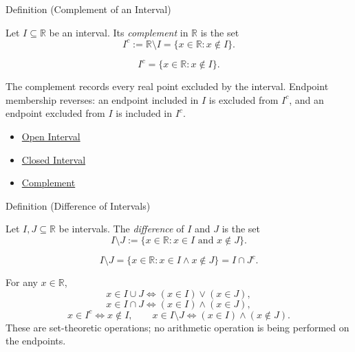 \begin{definitionbox}{Definition (Complement of an Interval)}
\begin{definition}
\label{def:complement-of-interval}
Let $I\subseteq\mathbb{R}$ be an interval. Its \emph{complement} in
$\mathbb{R}$ is the set
\[
  I^{c}:=\mathbb{R}\setminus I
  =
  \{x\in\mathbb{R}:x\notin I\}.
\]
\end{definition}
\end{definitionbox}

\begin{remark*}
\[
I^c=\{x\in\mathbb{R}:x\notin I\}.
\]
\end{remark*}

\begin{remark*}[Interpretation]
The complement records every real point excluded by the interval. Endpoint
membership reverses: an endpoint included in $I$ is excluded from $I^c$, and an
endpoint excluded from $I$ is included in $I^c$.
\end{remark*}

\begin{dependencies}
\begin{itemize}
  \item \hyperref[def:open-interval]{Open Interval}
  \item \hyperref[def:closed-interval]{Closed Interval}
  \item \hyperref[def:complement]{Complement}
\end{itemize}
\end{dependencies}

\begin{definitionbox}{Definition (Difference of Intervals)}
\begin{definition}
\label{def:difference-of-intervals}
Let $I,J\subseteq\mathbb{R}$ be intervals.  The \emph{difference} of $I$ and
$J$ is the set
\[
  I\setminus J
  :=
  \{x\in\mathbb{R}:x\in I\text{ and }x\notin J\}.
\]
\end{definition}
\end{definitionbox}

\begin{remark*}
\[
I\setminus J=\{x\in\mathbb{R}:x\in I\land x\notin J\}=I\cap J^c.
\]
\end{remark*}

\begin{remark*}
For any $x\in\mathbb{R}$,
\[
x\in I\cup J \Longleftrightarrow (x\in I)\lor(x\in J),
\]
\[
x\in I\cap J \Longleftrightarrow (x\in I)\land(x\in J),
\]
\[
x\in I^c \Longleftrightarrow x\notin I,
\qquad
x\in I\setminus J \Longleftrightarrow (x\in I)\land(x\notin J).
\]
These are set-theoretic operations; no arithmetic operation is being performed
on the endpoints.
\end{remark*}

